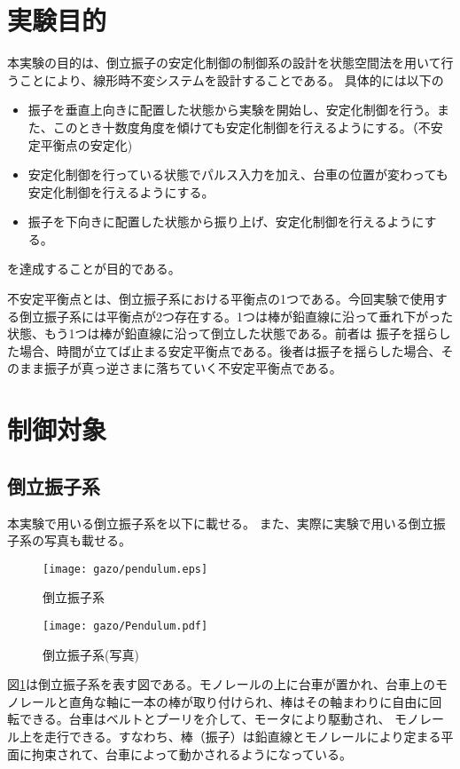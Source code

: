 \section{実験目的}
本実験の目的は、倒立振子の安定化制御の制御系の設計を状態空間法を用いて行うことにより、線形時不変システムを設計することである。
具体的には以下の
\begin{itemize}
	\item 振子を垂直上向きに配置した状態から実験を開始し、安定化制御を行う。また、このとき十数度角度を傾けても安定化制御を行えるようにする。（不安定平衡点の安定化)
	\item 安定化制御を行っている状態でパルス入力を加え、台車の位置が変わっても安定化制御を行えるようにする。
	\item 振子を下向きに配置した状態から振り上げ、安定化制御を行えるようにする。
\end{itemize}
を達成することが目的である。\cite{Koga:Binpe}
\par
不安定平衡点とは、倒立振子系における平衡点の1つである。今回実験で使用する倒立振子系には平衡点が2つ存在する。1つは棒が鉛直線に沿って垂れ下がった状態、もう1つは棒が鉛直線に沿って倒立した状態である。前者は
振子を揺らした場合、時間が立てば止まる安定平衡点である。後者は振子を揺らした場合、そのまま振子が真っ逆さまに落ちていく不安定平衡点である。
\newpage
\section{制御対象}
\subsection{倒立振子系}
本実験で用いる倒立振子系を以下に載せる。
また、実際に実験で用いる倒立振子系の写真も載せる。
\begin{figure}[H]
	\centering
	\texttt{[image: gazo/pendulum.eps]}
	\caption{倒立振子系}
	\label{image:pendulum}
\end{figure}
\begin{figure}[H]
	\centering
	\texttt{[image: gazo/Pendulum.pdf]}
	\caption{倒立振子系(写真)}
	\label{image:pendulum_photo}
\end{figure}
図\ref{image:pendulum}は倒立振子系を表す図である。モノレールの上に台車が置かれ、台車上のモノレールと直角な軸に一本の棒が取り付けられ、棒はその軸まわりに自由に回転できる。台車はベルトとプーリを介して、モータにより駆動され、
モノレール上を走行できる。すなわち、棒（振子）は鉛直線とモノレールにより定まる平面に拘束されて、台車によって動かされるようになっている。\\
